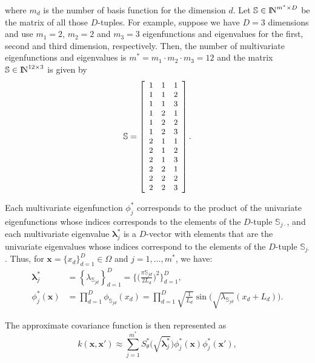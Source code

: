 \documentclass[onecolumn,a4paper,11pt]{article}
\begin{document}
\noindent where $m_d$ is the number of basis function for the dimension $d$. Let $\mathbb{S}\in {\rm I\!N}^{m^{\ast} \times D}$ be the matrix of all those $D$-tuples. For example, suppose we have $D=3$ dimensions and use $m_{1}=2$, $m_{2}=2$ and $m_{3}=3$ eigenfunctions and eigenvalues for the first, second and third dimension, respectively. Then, the number of multivariate eigenfunctions and eigenvalues is $m^{\ast} = m_{1} \cdot m_{2} \cdot m_{3} = 12$ and the matrix $\mathbb{S}\in {\rm I\!N}^{12 \times 3}$ is given by
\begin{align}\small
\mathbb{S}=
\left[ {\begin{array}{ccc}
1 & 1 & 1 \nonumber \\
1 & 1 & 2 \\
1 & 1 & 3 \\
1 & 2 & 1 \\
1 & 2 & 2 \\
1 & 2 & 3 \\
2 & 1 & 1 \\
2 & 1 & 2 \\
2 & 1 & 3 \\
2 & 2 & 1 \\
2 & 2 & 2 \\
2 & 2 & 3 
\end{array} } \right].
\end{align} 

Each multivariate eigenfunction $\phi^{\ast}_j$ corresponds to the product of the univariate eigenfunctions whose indices corresponds to the elements of the $D$-tuple $\mathbb{S}_{j\cdotp}$, and each multivariate eigenvalue $\bm{\lambda}^{\ast}_j$ is a $D$-vector with elements that are the univariate eigenvalues whose indices correspond to the elements of the $D$-tuple $\mathbb{S}_{j\bm{\cdotp}}$. Thus, for $\bm{x}=\{x_d\}_{d=1}^D \in \Omega$ and $j=1,\ldots,m^{\ast}$, we have: 
%
\begin{align}
\bm{\lambda}^{\ast}_j &= \left\{ \lambda_{\mathbb{S}_{jd}} \right\}_{d=1}^D =  \Big\{ \Big(\frac{\pi \mathbb{S}_{jd}}{2L_d}\Big)^{\!2} \Big\}_{d=1}^D, \label{eq_eigenvalue_multi} \\
%
\phi^{\ast}_j(\bm{x}) &= \prod_{d=1}^{D} \phi_{\mathbb{S}_{jd}}(x_d) = \prod_{d=1}^{D} \sqrt{\frac{1}{L_d}} \sin\!\!\big(\sqrt{\lambda_{\mathbb{S}_{jd}}}(x_d+L_d)\big). \label{eq_eigenfunction_multi}
\end{align}

\noindent The approximate covariance function is then represented as
%
\begin{equation}\label{eq_approxcov_multi}
k(\bm{x},\bm{x}') \approx \sum_{j=1}^{m^{\ast}} 
S^{\ast}_{\theta}\big(\sqrt{\bm{\lambda}^{\ast}_j}\big)
\phi^{\ast}_j(\bm{x}) \phi^{\ast}_j(\bm{x}'),
\end{equation}
\end{document}
